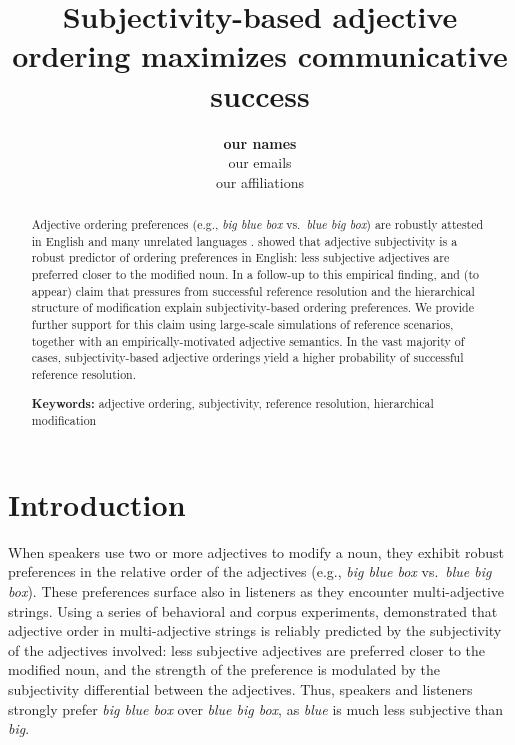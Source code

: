 \documentclass[10pt,a4paper]{article}
\title{Subjectivity-based adjective ordering maximizes communicative success}
\author{\large \textbf{our names}\\
our emails\\
our affiliations}
\begin{document}
\maketitle

\begin{abstract}
Adjective ordering preferences (e.g., \emph{big blue box} vs.~\emph{blue big box}) are robustly attested in English and many unrelated languages \cite{dixon1982}.  showed that adjective subjectivity is a robust predictor of ordering preferences in English: less subjective adjectives are preferred closer to the modified noun. In a follow-up to this empirical finding,  and \citeauthor{scontrasetalSPadjectives} (to appear) claim that pressures from successful reference resolution and the hierarchical structure of modification explain subjectivity-based ordering preferences. We provide further support for this claim using large-scale simulations of reference scenarios, together with an empirically-motivated adjective semantics. In the vast majority of cases, subjectivity-based adjective orderings yield a higher probability of successful reference resolution.


\textbf{Keywords:} 
adjective ordering, subjectivity, reference resolution, hierarchical modification

\end{abstract}

\section{Introduction}

When speakers use two or more adjectives to modify a noun, they exhibit robust preferences in the relative order of the adjectives (e.g., \emph{big blue box} vs.~\emph{blue big box}). These preferences surface also in listeners as they encounter multi-adjective strings. Using a series of behavioral and corpus experiments,  demonstrated that adjective order in multi-adjective strings is reliably predicted by the subjectivity of the adjectives involved: less subjective adjectives are preferred closer to the modified noun, and the strength of the preference is modulated by the subjectivity differential between the adjectives. Thus, speakers and listeners strongly prefer \emph{big blue box} over \emph{blue big box}, as \emph{blue} is much less subjective than \emph{big}.
\end{document}
